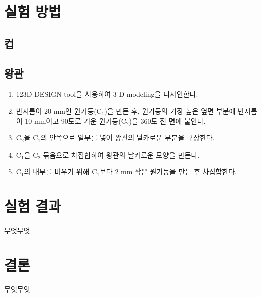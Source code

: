 \documentclass[a4paper, 10pt, nanum]{CSUniSchoolLabReport}
\begin{document}

\section{실험 방법}

\subsection{컵}

\subsection{왕관}

\begin{enumerate}[label=\arabic*.]
	\item 123D DESIGN tool을 사용하여 3-D modeling을 디자인한다.
	\item 반지름이 20 mm인 원기둥(C$_1$)을 만든 후, 원기둥의 가장 높은 옆면 부분에 반지름이 10 mm이고 90도로 기운 원기둥(C$_2$)을 360도 전 면에 붙인다.
	\item C$_2$을 C$_1$의 안쪽으로 일부를 넣어 왕관의 날카로운 부분을 구상한다.
	\item C$_1$을 C$_2$ 묶음으로 차집합하여 왕관의 날카로운 모양을 만든다.
	\item C$_1$의 내부를 비우기 위해 C$_1$보다 2 mm 작은 원기둥을 만든 후 차집합한다.
\end{enumerate}


\section{실험 결과}

	무엇무엇



\section{결론}

	무엇무엇



\end{document}
